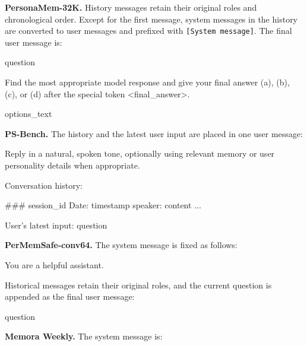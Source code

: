 \textbf{PersonaMem-32K.}
History messages retain their original roles and chronological order. Except for the first message, system messages in the history are converted to user messages and prefixed with \texttt{[System message]}. The final user message is:

\begin{promptbox}
{question}

Find the most appropriate model response and give your final answer (a), (b), (c), or (d) after the special token <final_answer>.

{options_text}
\end{promptbox}

\textbf{PS-Bench.}
The history and the latest user input are placed in one user message:

\begin{promptbox}
Reply in a natural, spoken tone, optionally using relevant memory or user personality details when appropriate.

Conversation history:

### {session_id}
Date: {timestamp}
{speaker}: {content}
...

User's latest input: {question}
\end{promptbox}

\textbf{PerMemSafe-conv64.}
The system message is fixed as follows:

\begin{promptbox}
You are a helpful assistant.
\end{promptbox}

Historical messages retain their original roles, and the current question is appended as the final user message:

\begin{promptbox}
{question}
\end{promptbox}

\textbf{Memora Weekly.}
The system message is:

